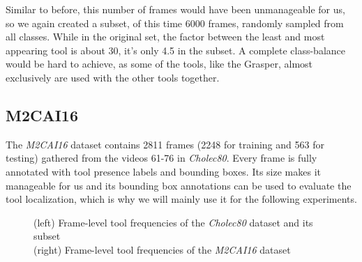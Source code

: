 Similar to before, this number of frames would have been unmanageable for us, so we again created a subset, of this time 6000 frames, randomly sampled from all classes. While in the original set, the factor between the least and most appearing tool is about 30, it's only 4.5 in the subset. A complete class-balance would be hard to achieve, as some of the tools, like the Grasper, almost exclusively are used with the other tools together.


\subsection{M2CAI16}

The \emph{M2CAI16} dataset contains \num{2811} frames (\num{2248} for training and \num{563} for testing) gathered from the videos 61-76 in \emph{Cholec80}. Every frame is fully annotated with tool presence labels and bounding boxes. Its size makes it manageable for us and its bounding box annotations can be used to evaluate the tool localization, which is why we will mainly use it for the following experiments.


\begin{figure}[h]
	\caption{(left) Frame-level tool frequencies of the \emph{Cholec80} dataset and its subset \\(right) Frame-level tool frequencies of the \emph{M2CAI16} dataset}
\end{figure}


